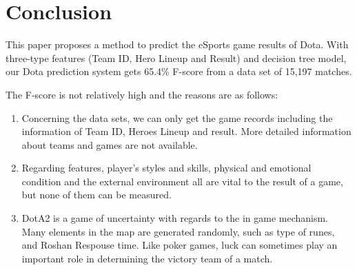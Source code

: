\section{Conclusion}
This paper proposes a method to predict the eSports game results of Dota.
With three-type features (Team ID, Hero Lineup and Result) and decision tree model, our Dota prediction system gets 65.4\% F-score from a data set of 15,197 matches.
 
The F-score is not relatively high and the reasons are as follows:
\begin{enumerate}
\item Concerning the data sets, we can only get the game records including the information of Team ID, Heroes Lineup and result.
More detailed information about teams and games are not available.

\item Regarding features, player’s styles and skills, physical and emotional condition and the external environment all are vital to the result of a game, but none of them can be measured.

\item DotA2 is a game of uncertainty with regards to the in game mechanism. Many elements in the map are generated randomly, such as type of runes, and Roshan Respouse time. Like poker games, luck can sometimes play an important role in determining the victory team of a match.

\end{enumerate}

